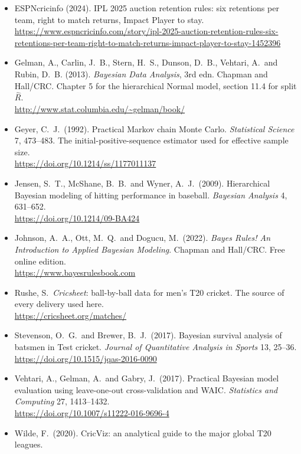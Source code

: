 \documentclass[11pt,a4paper]{article}
\begin{document}
\begin{itemize}[leftmargin=1.4em,itemsep=4pt]
\item ESPNcricinfo (2024). IPL 2025 auction retention rules: six retentions per team, right to
  match returns, Impact Player to stay.\\
  \url{https://www.espncricinfo.com/story/ipl-2025-auction-retention-rules-six-retentions-per-team-right-to-match-returns-impact-player-to-stay-1452396}
\item Gelman, A., Carlin, J.\ B., Stern, H.\ S., Dunson, D.\ B., Vehtari, A.\ and Rubin, D.\ B.
  (2013). \emph{Bayesian Data Analysis}, 3rd edn. Chapman and Hall/CRC. Chapter 5 for the
  hierarchical Normal model, section 11.4 for split $\hat R$.\\
  \url{http://www.stat.columbia.edu/~gelman/book/}
\item Geyer, C.\ J.\ (1992). Practical Markov chain Monte Carlo. \emph{Statistical Science} 7,
  473--483. The initial-positive-sequence estimator used for effective sample size.\\
  \url{https://doi.org/10.1214/ss/1177011137}
\item Jensen, S.\ T., McShane, B.\ B.\ and Wyner, A.\ J.\ (2009). Hierarchical Bayesian
  modeling of hitting performance in baseball. \emph{Bayesian Analysis} 4, 631--652.\\
  \url{https://doi.org/10.1214/09-BA424}
\item Johnson, A.\ A., Ott, M.\ Q.\ and Dogucu, M.\ (2022). \emph{Bayes Rules! An Introduction
  to Applied Bayesian Modeling}. Chapman and Hall/CRC. Free online edition.\\
  \url{https://www.bayesrulesbook.com}
\item Rushe, S.\ \emph{Cricsheet}: ball-by-ball data for men's T20 cricket. The source of every
  delivery used here.\\
  \url{https://cricsheet.org/matches/}
\item Stevenson, O.\ G.\ and Brewer, B.\ J.\ (2017). Bayesian survival analysis of batsmen in
  Test cricket. \emph{Journal of Quantitative Analysis in Sports} 13, 25--36.\\
  \url{https://doi.org/10.1515/jqas-2016-0090}
\item Vehtari, A., Gelman, A.\ and Gabry, J.\ (2017). Practical Bayesian model evaluation using
  leave-one-out cross-validation and WAIC. \emph{Statistics and Computing} 27, 1413--1432.\\
  \url{https://doi.org/10.1007/s11222-016-9696-4}
\item Wilde, F.\ (2020). CricViz: an analytical guide to the major global T20 leagues.

\end{itemize}
\end{document}
